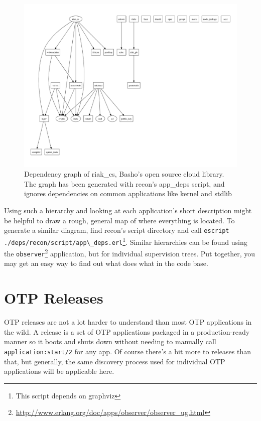 \documentclass[11pt, oneside]{book}   	%
\newcommand{\module}[1]{\Verb`#1`}
\newcommand{\function}[1]{\Verb`#1`}
\newcommand{\command}[1]{\Verb`#1`}
\begin{document}
\begin{figure}
  \includegraphics{app-deps-riak-cs.pdf}%
  \caption{Dependency graph of riak\_cs, Basho's open source cloud library.
  The graph has been generated with recon's app\_deps script, and ignores dependencies on common applications like kernel and stdlib}%
   \label{fig:app-deps}
\end{figure}

Using such a hierarchy and looking at each application's short description might be helpful to draw a rough, general map of where everything is located. To generate a similar diagram, find recon's script directory and call \command{escript ./deps/recon/script/app\_deps.erl}\footnote{This script depends on graphviz}. Similar hierarchies can be found using the \module{observer}\footnote{\href{http://www.erlang.org/doc/apps/observer/observer\_ug.html}{http://www.erlang.org/doc/apps/observer/observer\_ug.html}} application, but for individual supervision trees. Put together, you may get an easy way to find out what does what in the code base.

\section{OTP Releases}
\label{sec:dive-otp-releases}

OTP releases are not a lot harder to understand than most OTP applications in the wild. A release is a set of OTP applications packaged in a production-ready manner so it boots and shuts down without needing to manually call \function{application:start/2} for any app. Of course there's a bit more to releases than that, but generally, the same discovery process used for individual OTP applications will be applicable here.
\end{document}
